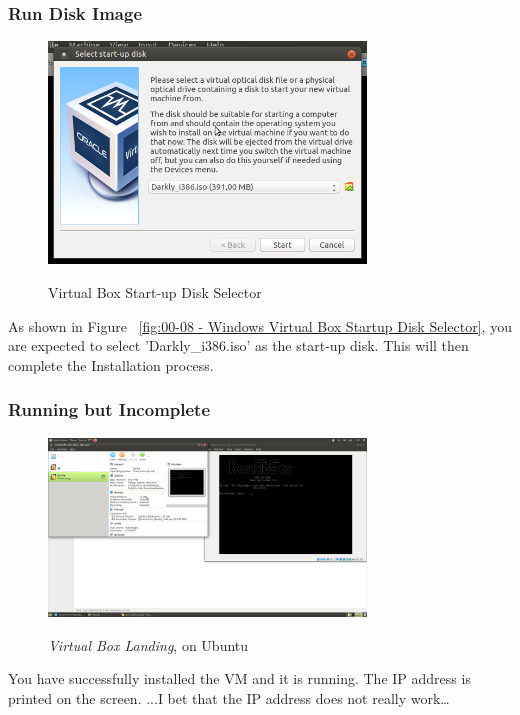 \subsubsection{Run Disk Image}
\begin{figure}[!htb]
    \centering
    \includegraphics[width=0.752\textwidth]{images/00-08.png}\\[0cm]  
    \caption[Windows Virtual Box]{Virtual Box Start-up Disk Selector}
    \label{fig:00-08 - Windows Virtual Box Startup Disk Selector} 
\end{figure}
As shown in Figure ~\vref{fig:00-08 - Windows Virtual Box Startup Disk Selector},
you are expected to select 'Darkly\_i386.iso' as the start-up disk. This will
then complete the Installation process.

\subsubsection{Running but Incomplete}
\begin{figure}[!htb]
    \centering
    \includegraphics[width=0.752\textwidth]{images/00-09.png}\\[0cm]  
    \caption[Windows Virtual Box]{\emph{Virtual Box Landing}, on Ubuntu}
    \label{fig:00-09 - Windows Virtual Box Running not complete} 
\end{figure}
You have successfully installed the VM and it is running. The IP address is
printed on the screen. ...I bet that the IP address does not really work\dots\\

